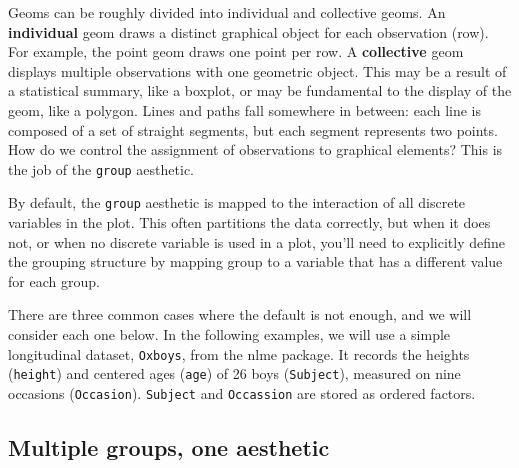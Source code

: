 Geoms can be roughly divided into individual and collective geoms. An
\textbf{individual} geom draws a distinct graphical object for each
observation (row). For example, the point geom draws one point per row.
A \textbf{collective} geom displays multiple observations with one
geometric object. This may be a result of a statistical summary, like a
boxplot, or may be fundamental to the display of the geom, like a
polygon. Lines and paths fall somewhere in between: each line is
composed of a set of straight segments, but each segment represents two
points. How do we control the assignment of observations to graphical
elements? This is the job of the \texttt{group} aesthetic.
  

By default, the \texttt{group} aesthetic is mapped to the interaction of
all discrete variables in the plot. This often partitions the data
correctly, but when it does not, or when no discrete variable is used in
a plot, you'll need to explicitly define the grouping structure by
mapping group to a variable that has a different value for each group.

There are three common cases where the default is not enough, and we
will consider each one below. In the following examples, we will use a
simple longitudinal dataset, \texttt{Oxboys}, from the nlme package. It
records the heights (\texttt{height}) and centered ages (\texttt{age})
of 26 boys (\texttt{Subject}), measured on nine occasions
(\texttt{Occasion}). \texttt{Subject} and \texttt{Occassion} are stored
as ordered factors.  

\begin{Shaded}
\begin{Highlighting}[]
 \NormalTok{)}
\end{Highlighting}
\end{Shaded}

\subsection{Multiple groups, one
aesthetic}\label{multiple-groups-one-aesthetic}

